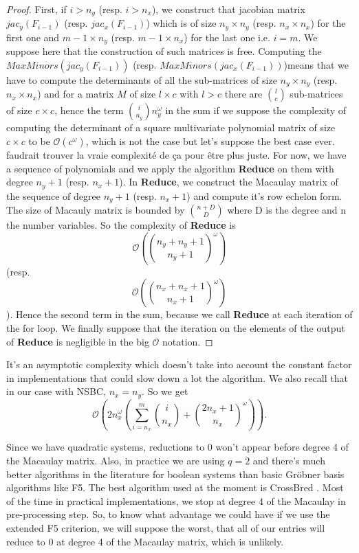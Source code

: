 \documentclass[english]{article}
\begin{document}
		 \begin{proof}
		 	First, if $i > n_y$ (resp. $i > n_x$), we construct that jacobian matrix $jac_y(F_{i-1})$ (resp. $jac_x(F_{i-1})$) which is of size $n_y \times n_y$ (resp. $n_x \times n_x$) for the first one and $m-1 \times n_y$ (resp. $m-1 \times n_x$) for the last one i.e. $i = m$. We suppose here that the construction of such matrices is free. Computing the $MaxMinors(jac_y(F_{i-1}))$ (resp. $MaxMinors(jac_x(F_{i-1}))$)means that we have to compute the determinants of all the sub-matrices of size $n_y \times n_y$ (resp. $n_x \times n_x$) and for a matrix $M$ of size $l \times c$ with $l > c$ there are $\binom{l}{c}$ sub-matrices of size $c \times c$, hence the term $\binom{i}{n_y}n_y^{\omega}$ in the sum if we suppose the complexity of computing the determinant of a square multivariate polynomial matrix of size $c \times c$ to be $\mathcal{O}(c^\omega)$, which is not the case but let's suppose the best case ever. faudrait trouver la vraie complexité de ça pour être plus juste.
		 	For now, we have a sequence of polynomials and we apply the algorithm \textbf{Reduce} on them with degree $n_y + 1$ (resp. $n_x + 1$).
		 	In \textbf{Reduce}, we construct the Macaulay matrix of the sequence of degree $n_y + 1$ (resp. $n_x + 1$) and compute it's row echelon form.
		 	The size of Macauly matrix is bounded by $\binom{n + D}{D}$ where D is the degree and n the number variables. So the complexity of \textbf{Reduce} is $$\mathcal{O}\left(\binom{n_y + n_y + 1}{n_y + 1}^\omega \right)$$ (resp. $$\mathcal{O}\left(\binom{n_x + n_x + 1}{n_x + 1}^\omega \right)$$). Hence the second term in the sum, because we call \textbf{Reduce} at each iteration of the for loop. We finally suppose that the iteration on the elements of the output of \textbf{Reduce} is negligible in the big $\mathcal{O}$ notation.
		 \end{proof}
		 
		 It's an asymptotic complexity which doesn't take into account the constant factor in implementations that could slow down a lot the algorithm.
		 We also recall that in our case with NSBC, $n_x = n_y$. So we get
		 $$
		 \mathcal{O}\left(2n_x^{\omega}\left(\sum_{i = n_x}^{m} \binom{i}{n_x} + \binom{2n_x + 1}{n_x}^\omega\right)\right).
		 $$
		 
		 Since we have quadratic systems, reductions to 0 won't appear before degree 4 of the Macaulay matrix. Also, in practice we are using $q=2$ and there's much better algorithms in the literature for boolean systems than basic Gröbner basis algorithms like F5. The best algorithm used at the moment is CrossBred \cite{JV17}. Most of the time in practical implementations, we stop at degree 4 of the Macaulay in pre-processing step. So, to know what advantage we could have if we use the extended F5 criterion, we will suppose the worst, that all of our entries will reduce to 0 at degree 4 of the Macaulay matrix, which is unlikely.
		 
\end{document}

